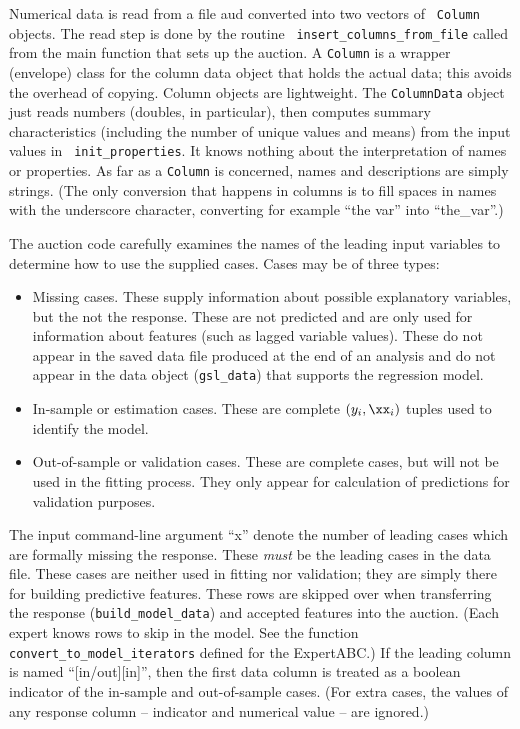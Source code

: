 \documentclass[12pt]{article}
\begin{document}
 Numerical data is read from a file aud converted into two vectors of {\tt
 Column} objects.  The read step is done by the routine {\tt
 insert\_columns\_from\_file} called from the main function that sets up the
 auction.  A {\tt Column} is a wrapper (envelope) class for the column data
 object that holds the actual data; this avoids the overhead of copying.  Column
 objects are lightweight.  The {\tt ColumnData} object just reads numbers
 (doubles, in particular), then computes summary characteristics (including the
 number of unique values and means) from the input values in {\tt
 init\_properties}.  It knows nothing about the interpretation of names or
 properties.  As far as a {\tt Column} is concerned, names and descriptions are
 simply strings.  (The only conversion that happens in columns is to fill spaces
 in names with the underscore character, converting for example ``the var'' into
 ``the\_var''.)

 The auction code carefully examines the names of the leading input variables to
 determine how to use the supplied cases.  Cases may be of three types:
\begin{itemize}
\item Missing cases.  These supply information about possible explanatory
 variables, but the not the response.  These are not predicted and are only used
 for information about features (such as lagged variable values).  These do not
 appear in the saved data file produced at the end of an analysis and do not
 appear in the data object ({\tt gsl\_data}) that supports the regression model.
\item In-sample or estimation cases.  These are complete $(y_i,\xx_i)$ tuples
 used to identify the model.
\item Out-of-sample or validation cases. These are complete cases, but will not
 be used in the fitting process.  They only appear for calculation of
 predictions for validation purposes.
\end{itemize}
 The input command-line argument ``x'' denote the number of leading cases which
 are formally missing the response.  These {\em must} be the leading cases in
 the data file.  These cases are neither used in fitting nor validation; they
 are simply there for building predictive features.  These rows are skipped over
 when transferring the response ({\tt build\_model\_data}) and accepted features
 into the auction.  (Each expert knows rows to skip in the model. See the
 function {\tt convert\_to\_model\_iterators} defined for the ExpertABC.)  If
 the leading column is named ``[in/out][in]'', then the first data column is
 treated as a boolean indicator of the in-sample and out-of-sample cases.  (For
 extra cases, the values of any response column -- indicator and numerical value
 -- are ignored.)
\end{document}
